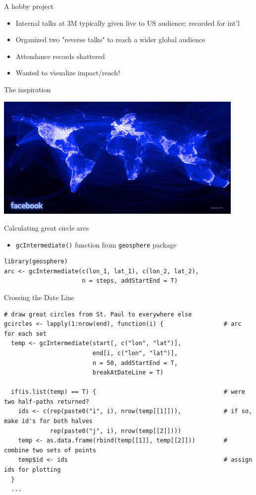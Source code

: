 \documentclass[sans,aspectratio=169,presentation,bigger,fleqn]{beamer}
\begin{document}
\begin{frame}[label=sec-15]{A hobby project}
\begin{itemize}
\item Internal talks at 3M typically given live to US audience; recorded for int'l
\item Organized two "reverse talks" to reach a wider global audience
\item Attendance records shattered
\item Wanted to visualize impact/reach!
\end{itemize}
\end{frame}
\begin{frame}[label=sec-16]{The inspiration}
\begin{center}
\includegraphics[height=6cm]{./img/facebook-map-lo.png}
\end{center}
\end{frame}
\begin{frame}[fragile,label=sec-17]{Calculating great circle arcs}
 \begin{itemize}
\item \texttt{gcIntermediate()} function from  \texttt{geosphere} package
\end{itemize}

\scriptsize
\begin{verbatim}
library(geosphere)
arc <- gcIntermediate(c(lon_1, lat_1), c(lon_2, lat_2),
                      n = steps, addStartEnd = T)
\end{verbatim}
\end{frame}
\begin{frame}[fragile,label=sec-18]{Crossing the Date Line}
 \scriptsize
\begin{verbatim}
# draw great circles from St. Paul to everywhere else
gcircles <- lapply(1:nrow(end), function(i) {                 # arc for each set
  temp <- gcIntermediate(start[, c("lon", "lat")],
                         end[i, c("lon", "lat")],
                         n = 50, addStartEnd = T,
                         breakAtDateLine = T)

  if(is.list(temp) == T) {                                    # were two half-paths returned?
    ids <- c(rep(paste0("i", i), nrow(temp[[1]])),            # if so, make id's for both halves
             rep(paste0("j", i), nrow(temp[[2]])))
    temp <- as.data.frame(rbind(temp[[1]], temp[[2]]))        # combine two sets of points
    temp$id <- ids                                            # assign ids for plotting
  }
  ...
\end{verbatim}
\normalsize
\end{frame}
\end{document}
